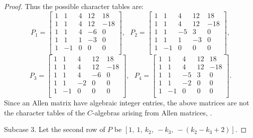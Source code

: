 \documentclass[12pt]{amsart}
\begin{document}
\begin{proof}
Thus the possible character tables are:
$$P_1=\left[
   \begin{array}{ccccc}
     1 & 1 & 4 &12&18\\
     1 & 1 &   4 & 12&-18\\
      1 &  1 & 4&  -6& 0\\
     1 & 1 &   1&  -3& 0\\
     1 &  -1 &  0&  0& 0\\
   \end{array}\right],\mbox{  } P_2=\left[
   \begin{array}{ccccc}
     1 & 1 & 4 &12&18\\
     1 & 1 &   4 & 12&-18\\
      1 &  1 & -5&  3& 0\\
     1 & 1 &   1&  -3& 0\\
     1 &  -1 &  0&  0& 0\\
   \end{array}\right],$$
$$P_3=\left[
   \begin{array}{ccccc}
     1 & 1 & 4 &12&18\\
     1 & 1 &   4 & 12&-18\\
      1 &  1 & 4&  -6& 0\\
     1 & 1 &  -2&  0& 0\\
     1 &  -1 &  0&  0& 0\\
   \end{array}\right],\mbox{   } P_4=\left[
   \begin{array}{ccccc}
     1 & 1 & 4 &12&18\\
     1 & 1 &   4 & 12&-18\\
      1 &  1 & -5&  3& 0\\
      1 & 1 &  -2&  0& 0\\
     1 &  -1 &  0&  0& 0\\
   \end{array}\right].$$
Since an Allen matrix have algebraic integer entries, the above matrices are not the character tables of the $C$-algebras arising from Allen matrices, \cite[Proposition 15]{G1}.

\medskip

Subcase 3. Let the second row of $P$ be $[1, ~ 1,~     k_2,   ~-k_3,~ -(k_2-k_3+2)]$.

\smallskip


\end{proof}
\end{document}

